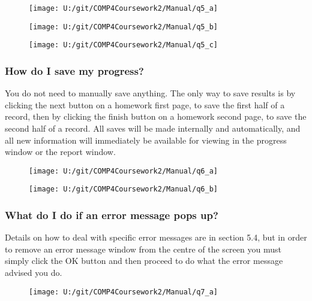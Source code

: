 \begin{figure}[H]
    \texttt{[image: U:/git/COMP4Coursework2/Manual/q5\_a]}
\end{figure}

\begin{figure}[H]
    \texttt{[image: U:/git/COMP4Coursework2/Manual/q5\_b]}
\end{figure}

\begin{figure}[H]
    \texttt{[image: U:/git/COMP4Coursework2/Manual/q5\_c]}
\end{figure}

\subsubsection{How do I save my progress?}

You do not need to manually save anything. The only way to save results is by clicking the next button on a homework first page, to save the first half of a record, then by clicking the finish button on a homework second page, to save the second half of a record. All saves will be made internally and automatically, and all new information will immediately be available for viewing in the progress window or the report window.

\begin{figure}[H]
    \texttt{[image: U:/git/COMP4Coursework2/Manual/q6\_a]}
\end{figure}

\begin{figure}[H]
    \texttt{[image: U:/git/COMP4Coursework2/Manual/q6\_b]}
\end{figure}

\subsubsection{What do I do if an error message pops up?}

Details on how to deal with specific error messages are in section 5.4, but in order to remove an error message window from the centre of the screen you must simply click the OK button and then proceed to do what the error message advised you do.

\begin{figure}[H]
    \texttt{[image: U:/git/COMP4Coursework2/Manual/q7\_a]}
\end{figure}

